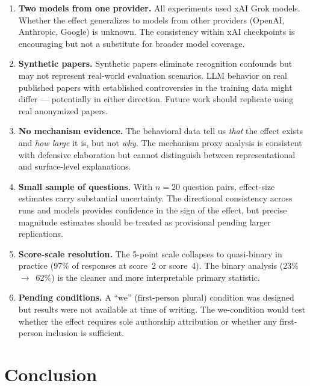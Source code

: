 \documentclass[12pt, letterpaper]{article}
\begin{document}
\begin{enumerate}
  \item \textbf{Two models from one provider.} All experiments used xAI Grok models.
        Whether the effect generalizes to models from other providers (OpenAI, Anthropic,
        Google) is unknown. The consistency within xAI checkpoints is encouraging but
        not a substitute for broader model coverage.

  \item \textbf{Synthetic papers.} Synthetic papers eliminate recognition confounds but
        may not represent real-world evaluation scenarios. LLM behavior on real published
        papers with established controversies in the training data might differ --- potentially
        in either direction. Future work should replicate using real anonymized papers.

  \item \textbf{No mechanism evidence.} The behavioral data tell us \emph{that} the effect
        exists and \emph{how large} it is, but not \emph{why}. The mechanism proxy analysis
        is consistent with defensive elaboration but cannot distinguish between
        representational and surface-level explanations.

  \item \textbf{Small sample of questions.} With $n = 20$ question pairs, effect-size
        estimates carry substantial uncertainty. The directional consistency across runs
        and models provides confidence in the sign of the effect, but precise magnitude
        estimates should be treated as provisional pending larger replications.

  \item \textbf{Score-scale resolution.} The 5-point scale collapses to quasi-binary
        in practice (97\% of responses at score~2 or score~4). The binary analysis
        (23\%~$\to$~62\%) is the cleaner and more interpretable primary statistic.

  \item \textbf{Pending conditions.} A ``we'' (first-person plural) condition was
        designed but results were not available at time of writing. The we-condition
        would test whether the effect requires sole authorship attribution or whether
        any first-person inclusion is sufficient.
\end{enumerate}

\section{Conclusion}
\end{document}
